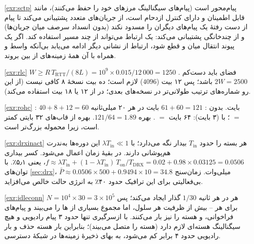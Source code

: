 \documentclass[11pt,a4paper]{article}
\begin{document}
\begin{solutionbox}{\ref{exr:sctp}}
 پیام‌محور است (پیام‌های سیگنالینگ مرزهای خود را حفظ می‌کنند)، مانند  قابل اطمینان و دارای
کنترل ازدحام است، از جریان‌های متعدد پشتیبانی می‌کند تا پیام از دست رفتهٔ یک  پیام‌های دیگران را
مسدود نکند (بدون انسداد سرصف میان جریان‌ها) و از چندخانگی پشتیبانی می‌کند: یک ارتباط می‌تواند از چند مسیر
 استفاده کند. اگر یک پیوند انتقال میان  و  قطع شود، ارتباط از نشانی دیگر ادامه
می‌یابد بی‌آنکه واسط  و همراه با آن همهٔ زمینه‌های  از بین بروند.
\end{solutionbox}

\begin{solutionbox}{\ref{exr:rlc}}
$W \ge R\,T_{\mathrm{RTT}}/(8L) = 10^9\times0.015/12\,000 = 1250$ . فضای  باید دست‌کم
$2W = 2500$ باشد؛ پس ۱۲ بیت ($4096$) لازم است؛ ده بیت نسخهٔ ۸  کافی نیست (از این رو شماره‌های ترتیب
طولانی‌تر  در نسخه‌های بعدی؛  در  از ۱۲ یا ۱۸ بیت استفاده می‌کند).
\end{solutionbox}

\begin{solutionbox}{\ref{exr:rohc}}
: $40+8+12 = 60$ بایت. بدون : $61+60 = 121$ بایت در هر ۲۰ میلی‌ثانیه $=$
؛ با  (۳ بایت): ۶۴ بایت $=$ . بهره $121/64 = 1.89$. بهره از قاب‌های ۳۲
بایتی کمتر است، زیرا محموله بزرگ‌تر است.
\end{solutionbox}

\begin{solutionbox}{\ref{exr:drxinact}}
هر بسته  را حدود $T_{\mathrm{in}}$ بیدار نگه می‌دارد؛ با $\lambda T_{\mathrm{in}} \ll 1$ این دوره‌ها به‌ندرت
هم‌پوشانی دارند. در بقیهٔ زمان  اعمال می‌شود. کسر بیداری
$f \approx \lambda T_{\mathrm{in}} + (1-\lambda T_{\mathrm{in}})\,T_{\mathrm{on}}/T_{\mathrm{DRX}}
= 0.02 + 0.98\times0.03125 = 0.0506$، یعنی ۵٫۱٪. با توان‌های \cref{sec:drx}،
$\bar P \approx 0.0506\times500 + 0.9494\times10 = 34.8$ میلی‌وات. زمان‌سنج بی‌فعالیتی برای این ترافیک حدود ۴۰٪
به انرژی حالت  خالص می‌افزاید.
\end{solutionbox}

\begin{solutionbox}{\ref{exr:idleconn}}
هر  در هر ثانیه $1/30$ گذار ایجاد می‌کند؛ پس $N = 10^4\times30 = 3\times10^5$  برای هر
 -- بیش از ظرفیت هر سلول، اما  مجموع بسیاری از ها را می‌بیند و پیام‌های فراخوانی،
 و  هسته را نیز بار می‌کنند. با  ازسرگیری تنها حدود ۳ پیام رادیویی و هیچ
سیگنالینگ هسته‌ای لازم دارد (هسته  را متصل می‌بیند)؛ بنابراین بار هسته حذف و بار رادیویی حدود ۴ برابر
کم می‌شود، به بهای ذخیرهٔ زمینه‌ها در شبکهٔ دسترسی.
\end{solutionbox}
\end{document}
